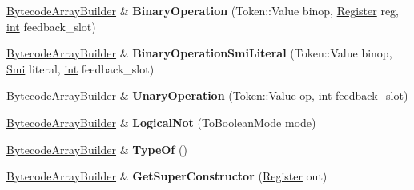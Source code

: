\begin{DoxyCompactItemize}
\mbox{\hyperlink{classv8_1_1internal_1_1interpreter_1_1BytecodeArrayBuilder}{Bytecode\+Array\+Builder}} \& {\bfseries Binary\+Operation} (Token\+::\+Value binop, \mbox{\hyperlink{classv8_1_1internal_1_1interpreter_1_1Register}{Register}} reg, \mbox{\hyperlink{classint}{int}} feedback\+\_\+slot)
\item 
\mbox{\label{classv8_1_1internal_1_1interpreter_1_1BytecodeArrayBuilder_ab12762f22ac375b061d362558707e1cb}} 
\mbox{\hyperlink{classv8_1_1internal_1_1interpreter_1_1BytecodeArrayBuilder}{Bytecode\+Array\+Builder}} \& {\bfseries Binary\+Operation\+Smi\+Literal} (Token\+::\+Value binop, \mbox{\hyperlink{classv8_1_1internal_1_1Smi}{Smi}} literal, \mbox{\hyperlink{classint}{int}} feedback\+\_\+slot)
\item 
\mbox{\label{classv8_1_1internal_1_1interpreter_1_1BytecodeArrayBuilder_a035528b88a41352095cdb74b4cf42b87}} 
\mbox{\hyperlink{classv8_1_1internal_1_1interpreter_1_1BytecodeArrayBuilder}{Bytecode\+Array\+Builder}} \& {\bfseries Unary\+Operation} (Token\+::\+Value op, \mbox{\hyperlink{classint}{int}} feedback\+\_\+slot)
\item 
\mbox{\label{classv8_1_1internal_1_1interpreter_1_1BytecodeArrayBuilder_a51e2b16a491adebe50f127a2afbc98c8}} 
\mbox{\hyperlink{classv8_1_1internal_1_1interpreter_1_1BytecodeArrayBuilder}{Bytecode\+Array\+Builder}} \& {\bfseries Logical\+Not} (To\+Boolean\+Mode mode)
\item 
\mbox{\label{classv8_1_1internal_1_1interpreter_1_1BytecodeArrayBuilder_ae6be0d520a7d5ca939bab3fd191d6755}} 
\mbox{\hyperlink{classv8_1_1internal_1_1interpreter_1_1BytecodeArrayBuilder}{Bytecode\+Array\+Builder}} \& {\bfseries Type\+Of} ()
\item 
\mbox{\label{classv8_1_1internal_1_1interpreter_1_1BytecodeArrayBuilder_ab2840458dc8a057a87a928e35fbdd4ed}} 
\mbox{\hyperlink{classv8_1_1internal_1_1interpreter_1_1BytecodeArrayBuilder}{Bytecode\+Array\+Builder}} \& {\bfseries Get\+Super\+Constructor} (\mbox{\hyperlink{classv8_1_1internal_1_1interpreter_1_1Register}{Register}} out)

\end{DoxyCompactItemize}
